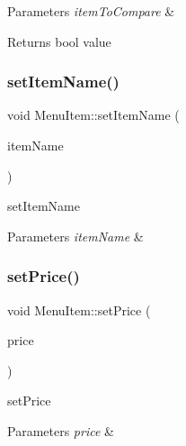 \begin{DoxyParams}{Parameters}
{\em item\+To\+Compare} & \\
\hline
\end{DoxyParams}
\begin{DoxyReturn}{Returns}
bool value 
\end{DoxyReturn}
\mbox{\label{class_menu_item_abc651e3a5656b7fbb0e72085b8adab0e}} 
\subsubsection{\texorpdfstring{set\+Item\+Name()}{setItemName()}}
{\footnotesize\ttfamily void Menu\+Item\+::set\+Item\+Name (\begin{DoxyParamCaption}\item[{Q\+String}]{item\+Name }\end{DoxyParamCaption})}



set\+Item\+Name 


\begin{DoxyParams}{Parameters}
{\em item\+Name} & \\
\hline
\end{DoxyParams}
\mbox{\label{class_menu_item_ae2ebb751e94c46e5bbe32dc2f8003919}} 
\subsubsection{\texorpdfstring{set\+Price()}{setPrice()}}
{\footnotesize\ttfamily void Menu\+Item\+::set\+Price (\begin{DoxyParamCaption}\item[{double}]{price }\end{DoxyParamCaption})}



set\+Price 


\begin{DoxyParams}{Parameters}
{\em price} & \\
\hline
\end{DoxyParams}
\mbox{\label{class_menu_item_a046acac8a4f20c6d3589ac34bb53ea71}} 
